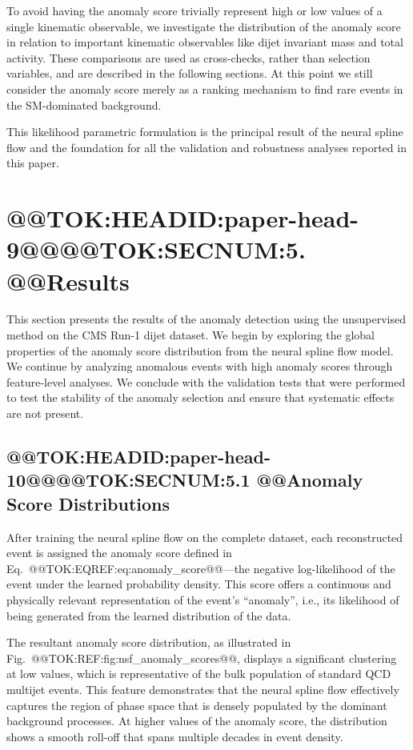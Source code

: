 \documentclass[11pt]{article}
\begin{document}
To avoid having the anomaly score trivially represent high or low values of a single kinematic observable, we investigate the distribution of the anomaly score in relation to important kinematic observables like dijet invariant mass and total activity. These comparisons are used as cross-checks, rather than selection variables, and are described in the following sections. At this point we still consider the anomaly score merely as a ranking mechanism to find rare events in the SM-dominated background.

This likelihood parametric formulation is the principal result of the neural spline flow and the foundation for all the validation and robustness analyses reported in this paper.
\section{@@TOK:HEADID:paper-head-9@@@@TOK:SECNUM:5. @@Results}

This section presents the results of the anomaly detection using the unsupervised method on the CMS Run-1 dijet dataset. We begin by exploring the global properties of the anomaly score distribution from the neural spline flow model. We continue by analyzing anomalous events with high anomaly scores through feature-level analyses. We conclude with the validation tests that were performed to test the stability of the anomaly selection and ensure that systematic effects are not present.

\subsection{@@TOK:HEADID:paper-head-10@@@@TOK:SECNUM:5.1 @@Anomaly Score Distributions}

After training the neural spline flow on the complete dataset, each reconstructed event is assigned the anomaly score defined in Eq.~@@TOK:EQREF:eq:anomaly_score@@---the negative log-likelihood of the event under the learned probability density. This score offers a continuous and physically relevant representation of the event's ``anomaly'', i.e., its likelihood of being generated from the learned distribution of the data.

The resultant anomaly score distribution, as illustrated in Fig.~@@TOK:REF:fig:nsf_anomaly_scores@@, displays a significant clustering at low values, which is representative of the bulk population of standard QCD multijet events. This feature demonstrates that the neural spline flow effectively captures the region of phase space that is densely populated by the dominant background processes. At higher values of the anomaly score, the distribution shows a smooth roll-off that spans multiple decades in event density.
\end{document}
